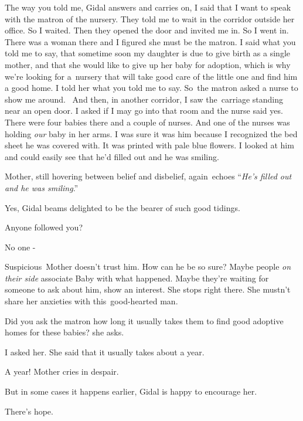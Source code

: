 \documentclass[twoside,11pt]{book}
\begin{document}
{\textquotedbl}The way you told me,{\textquotedbl} Gidal answers and carries on, {\textquotedbl}I said that I want to
speak with the matron of the nursery. They told me to wait in the corridor outside her office. So I waited. Then they
opened the door and invited me in. So I went in. There was a woman there and I figured she must be the matron. I said
what you told me to say, that sometime soon my daughter is due to give birth as a single mother, and that she would
like to give up her baby for adoption, which is why we're looking for a~nursery that will take good care of the little
one and find him a good home. I told her what you told me to say. So~the matron asked a nurse to show me around.~ And
then, in another corridor, I saw the~carriage standing near an open door. I asked if I may go into that room and the
nurse said yes. There were four babies there and a couple of nurses. And one of the nurses was holding\textit{ our
}baby in her arms. I was sure it was him because I recognized the bed sheet he was covered with. It was printed with
pale blue flowers. I looked at him and could easily see that he'd filled out and he was smiling. {\textquotedbl} 

Mother, still hovering between belief and disbelief, again{\ }echoes
``\textit{He's filled out and he was smiling}.'' 

{\textquotedbl}Yes,{\textquotedbl} Gidal beams delighted to be the bearer of such good tidings. 

{\textquotedbl}Anyone followed you?{\textquotedbl} 

{\textquotedbl}No one -{\textquotedbl} 

Suspicious{\ }Mother doesn't trust him. How can he be so sure? Maybe people
\textit{on their side} associate Baby with what happened. Maybe they're waiting for someone to ask about him, show an
interest. She stops right there. She mustn't share her anxieties with this\ good{}-hearted man. 

{\textquotedbl}Did you ask the matron how long it usually takes them to find good adoptive homes for these
babies?{\textquotedbl} she asks.

{\textquotedbl}I asked her. She said that it usually takes about a year.{\textquotedbl} 

{\textquotedbl}A year!{\textquotedbl} Mother cries in despair. 

{\textquotedbl}But in some cases it happens earlier,{\textquotedbl} Gidal is happy to encourage her. 

{\textquotedbl}There's hope.{\textquotedbl} 
\end{document}
